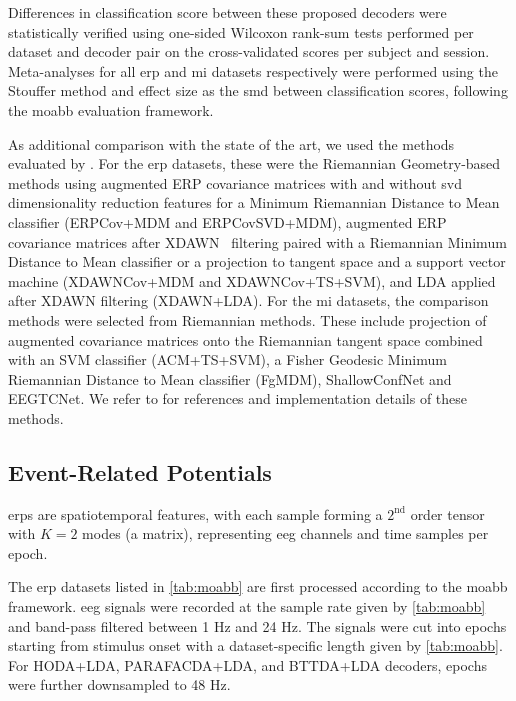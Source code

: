 \documentclass[twocolumn]{article}
\begin{document}
Differences in classification score between these proposed decoders
were statistically verified using one-sided Wilcoxon rank-sum tests performed per
dataset and decoder
pair on the cross-validated scores per subject and session.
Meta-analyses for all \ac{erp} and \ac{mi} datasets respectively
were performed using the Stouffer method and effect size as the \ac{smd} between classification scores, following the \ac{moabb} evaluation framework.

As additional comparison with the state of the art, we used the methods evaluated by
\textcite{Chevallier2024}.
For the \ac{erp} datasets, these were the Riemannian Geometry-based methods
using augmented ERP covariance matrices with and without \acl{svd} dimensionality
reduction features for a Minimum Riemannian Distance to Mean classifier
(ERPCov+MDM and ERPCovSVD+MDM), augmented ERP covariance matrices after
XDAWN~\cite{Rivet2009}
filtering paired with a Riemannian Minimum Distance to Mean classifier or a
projection to tangent space and a support vector machine
(XDAWNCov+MDM and XDAWNCov+TS+SVM), and LDA applied after XDAWN filtering
(XDAWN+LDA).
For the \ac{mi} datasets, the comparison methods were selected from Riemannian
methods.
These include projection of augmented covariance matrices onto the Riemannian
tangent space combined with an SVM classifier (ACM+TS+SVM), a Fisher Geodesic
Minimum Riemannian Distance to Mean classifier (FgMDM), ShallowConfNet and EEGTCNet.
We refer to \textcite{Chevallier2024} for references and implementation details
of these methods.

\subsection{Event-Related Potentials}
\Acp{erp} are spatiotemporal features, with each sample forming a $2^\text{nd}$
order tensor with $K=2$ modes (a matrix), representing \ac{eeg} channels and time samples
per epoch.

The \ac{erp} datasets listed in \cref{tab:moabb}
are first processed according to the \ac{moabb} framework.
\Ac{eeg} signals were recorded at the sample rate given
by \cref{tab:moabb} and band-pass filtered between 1 Hz
and 24 Hz.
The signals were cut into epochs starting from stimulus onset with a
dataset-specific length given by \cref{tab:moabb}.
For HODA+LDA, PARAFACDA+LDA, and BTTDA+LDA decoders, epochs were further
downsampled to 48 Hz.
\end{document}
